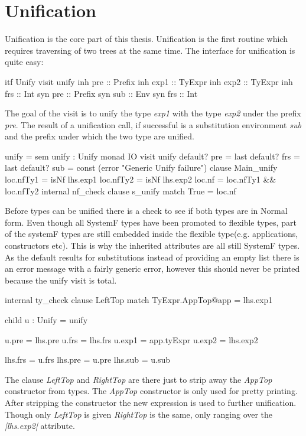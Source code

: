 \section{Unification}
Unification is the core part of this thesis. Unification is the first routine which requires traversing of two trees at the same time. The interface for unification is quite easy:

\begin{code}
itf Unify
  visit unify
    inh pre   :: Prefix
    inh exp1  :: TyExpr
    inh exp2  :: TyExpr
    inh frs   :: Int
    syn pre   :: Prefix
    syn sub   :: Env
    syn frs   :: Int
\end{code}

The goal of the visit is to unify the type \emph{exp1} with the type \emph{exp2} under the prefix \emph{pre}. The result of a unification call, if successful is a substitution environment \emph{sub} and the prefix under which the two type are unified.

\begin{code}
unify = sem unify : Unify monad IO    
          visit unify
             default? pre  = last
             default? frs  = last
             default? sub  = const (error "Generic Unify failure")
             clause Main_unify
               loc.nfTy1  = isNf lhs.exp1
               loc.nfTy2  = isNf lhs.exp2
               loc.nf     = loc.nfTy1 && loc.nfTy2
               internal nf_check
                 clause s_unify
                   match True  = loc.nf
\end{code}
Before types can be unified there is a check to see if both types are in Normal form. Even though all SystemF types have been promoted to flexible types, part of the systemF types are still embedded inside the flexible type(e.g. applications, constructors etc). This is why the inherited attributes are all still SystemF types. As the default results for substitutions instead of providing an empty list there is an error message with a fairly generic error, however this should never be printed because the unify visit is total.

\begin{code}
internal ty_check
  clause LeftTop
    match TyExpr.AppTop@app = lhs.exp1
    
    child u : Unify = unify
    
    u.pre    = lhs.pre
    u.frs    = lhs.frs
    u.exp1   = app.tyExpr
    u.exp2   = lhs.exp2
             
    lhs.frs  = u.frs
    lhs.pre  = u.pre
    lhs.sub  = u.sub
\end{code}
The clause \emph{LeftTop} and \emph{RightTop} are there just to strip away the \emph{AppTop} constructor from types. The \emph{AppTop} constructor is only used for pretty printing. After stripping the constructor the new expression is used to further unification. Though only \emph{LeftTop} is given \emph{RightTop} is the same, only ranging over the \emph{|lhs.exp2|} attribute.

